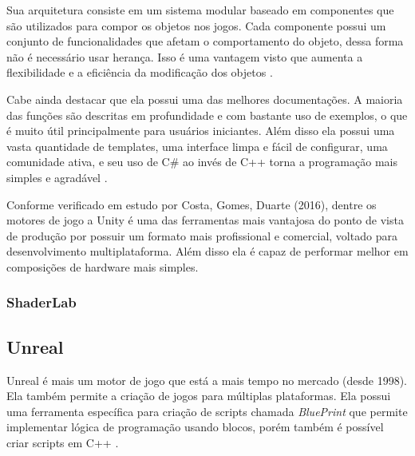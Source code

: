 Sua arquitetura consiste em um sistema modular baseado em componentes que são utilizados para compor os objetos nos jogos. Cada componente possui um conjunto de funcionalidades que afetam o comportamento do objeto, dessa forma não é necessário usar herança. Isso é uma vantagem visto que aumenta a flexibilidade e a eficiência da modificação dos objetos \cite{compStudyGE}.

Cabe ainda destacar que ela possui uma das melhores documentações. A maioria das funções são descritas em profundidade e com bastante uso de exemplos, o que é muito útil principalmente para usuários iniciantes. Além disso ela possui uma vasta quantidade de templates, uma interface limpa e fácil de configurar, uma comunidade ativa, e seu uso de C\# ao invés de C++ torna a programação mais simples e agradável \cite{compStudyGE}.

Conforme verificado em estudo por Costa, Gomes, Duarte (2016)\nocite{estudoUnity}, dentre os motores de jogo a Unity é uma das ferramentas mais vantajosa do ponto de vista de produção por possuir um formato mais profissional e comercial, voltado para desenvolvimento multiplataforma. Além disso ela é capaz de performar melhor em composições de hardware mais simples.

\subsubsection{ShaderLab}
\label{sec:shaderlab}

\subsection{Unreal}
\label{sec:unreal}

Unreal é mais um motor de jogo que está a mais tempo no mercado (desde 1998). Ela também permite a criação de jogos para múltiplas plataformas. Ela possui uma ferramenta específica para criação de scripts chamada \textit{BluePrint} que permite implementar lógica de programação usando blocos, porém também é possível criar scripts em C++ \cite{compStudyGE}.

\begin{figure}[h!]
	\centering
\end{figure}
\nocite{blueprint}

